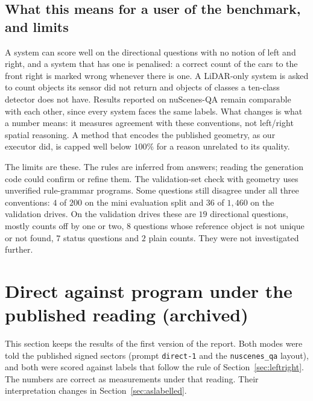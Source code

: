 \documentclass[11pt,a4paper]{article}
\newcommand{\code}[1]{\texttt{\small #1}}
\begin{document}
\subsection{What this means for a user of the benchmark, and limits}
\label{sec:meaning}

A system can score well on the directional questions with no notion of left
and right, and a system that has one is penalised: a correct count of the
cars to the front right is marked wrong whenever there is one. A LiDAR-only
system is asked to count objects its sensor did not return and objects of
classes a ten-class detector does not have. Results reported on nuScenes-QA
remain comparable with each other, since every system faces the same labels.
What changes is what a number means: it measures agreement with these
conventions, not left/right spatial reasoning. A method that encodes the
published geometry, as our executor did, is capped well below $100\%$ for a
reason unrelated to its quality.

The limits are these. The rules are inferred from answers; reading the
generation code could confirm or refine them. The validation-set check with
geometry uses unverified rule-grammar programs. Some questions still disagree
under all three conventions: $4$ of $200$ on the mini evaluation split and
$36$ of $1{,}460$ on the validation drives. On the validation drives these
are $19$ directional questions, mostly counts off by one or two, $8$
questions whose reference object is not unique or not found, $7$ status
questions and $2$ plain counts. They were not investigated further.

\section{Direct against program under the published reading (archived)}
\label{sec:published}

This section keeps the results of the first version of the report. Both
modes were told the published signed sectors (prompt \code{direct-1} and the
\code{nuscenes\_qa} layout), and both were scored against labels that follow
the rule of Section~\ref{sec:leftright}. The numbers are correct as
measurements under that reading. Their interpretation changes in
Section~\ref{sec:aslabelled}.
\end{document}
